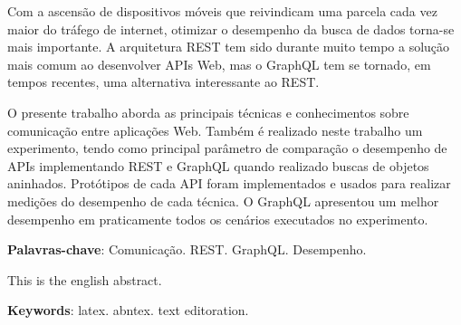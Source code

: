 \setlength{\absparsep}{18pt} %
\begin{resumo}

    Com a ascensão de dispositivos móveis que reivindicam uma parcela cada vez maior do tráfego de internet, otimizar o desempenho da busca de dados torna-se mais importante. A arquitetura REST tem sido durante muito tempo a solução mais comum ao desenvolver APIs Web, mas o GraphQL tem se tornado, em tempos recentes, uma alternativa interessante ao REST. 
    
    O presente trabalho aborda as principais técnicas e conhecimentos sobre comunicação entre aplicações Web. Também é realizado neste trabalho um experimento, tendo como principal parâmetro de comparação o desempenho de APIs implementando REST e GraphQL quando realizado buscas de objetos aninhados. Protótipos de cada API foram implementados e usados para realizar medições do desempenho de cada técnica. O GraphQL apresentou um melhor desempenho em praticamente todos os cenários executados no experimento.

\textbf{Palavras-chave}: Comunicação. REST. GraphQL. Desempenho.

\end{resumo}

\begin{resumo}[Abstract]
 
   This is the english abstract.

   \vspace{\onelineskip}
 
   \noindent 
   \textbf{Keywords}: latex. abntex. text editoration.
 
\end{resumo}
